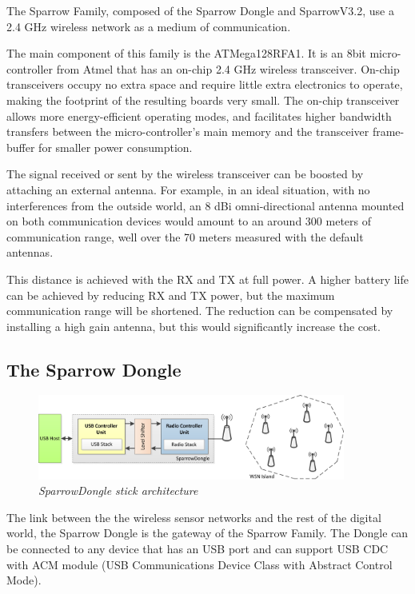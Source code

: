 The Sparrow Family, composed of the Sparrow Dongle and SparrowV3.2, use a 2.4 GHz wireless network as a medium of communication. 

The main component of this family is the ATMega128RFA1. It is an 8bit micro-controller from Atmel that has an on-chip 2.4 GHz wireless transceiver. On-chip transceivers occupy no extra space and require little extra electronics to operate, making the footprint of the resulting boards very small. The on-chip transceiver allows more energy-efficient operating modes, and facilitates higher bandwidth transfers between the micro-controller's main memory and the transceiver frame-buffer for smaller power consumption.

The signal received or sent by the wireless transceiver can be boosted by attaching an external antenna. For example, in an ideal situation, with no interferences from the outside world, an 8 dBi omni-directional antenna mounted on both communication devices would amount to an around 300 meters of communication range, well over the 70 meters measured with the default antennas.

This distance is achieved with the RX and TX at full power. A higher battery life can be achieved by reducing RX and TX power, but the maximum communication range will be shortened. The reduction can be compensated by installing a high gain antenna, but this would significantly increase the cost.

\subsection{The Sparrow Dongle}

\begin{figure}[ht]
\begin{center}
\includegraphics[width=0.9\textwidth]{img/donge_architecture.png}
\end{center}
\caption{\small \itshape{SparrowDongle stick architecture}\cite{voinescu2013lightweight}}
\end{figure}
 
The link between the the wireless sensor networks and the rest of the digital world, the Sparrow Dongle is the gateway of the Sparrow Family. The Dongle can be connected to any device that has an USB port and can support USB CDC with ACM module (USB Communications Device Class with Abstract Control Mode). 

